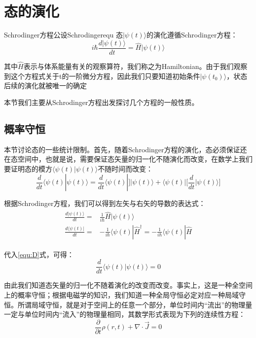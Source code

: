 \section{态的演化}\label{section2:evolution}
    \begin{definition}{Schrodinger方程公设}{Schrodingerequ}
        态$|\psi(t)\rangle$的演化遵循Schrodinger方程：
        \begin{equation}
            i\hbar\frac{d|\psi(t)\rangle}{dt}=\hat{H}|\psi(t)\rangle
        \end{equation}
        
        其中$\hat{H}$表示与体系能量有关的观察算符，我们称之为Hamiltonian。由于我们观察到这个方程式关于t的一阶微分方程，因此我们只要知道初始条件$|\psi(t_0)\rangle$，状态后续的演化就被唯一的确定
    \end{definition}
    
    本节我们主要从Schrodinger方程出发探讨几个方程的一般性质。
    \subsection{概率守恒}
    本节讨论态的一些统计限制。首先，随着Schrodinger方程的演化，态必须保证还在态空间中，也就是说，需要保证态矢量的归一化不随演化而改变，在数学上我们要证明态的模方$\langle\psi(t)|\psi(t)\rangle$不随时间而改变：
    \begin{equation}\label{equ:D}
        \frac{d}{dt}\langle\psi(t)|\psi(t)\rangle=\frac{d}{dt}\langle\psi(t)|\Big]|\psi(t)\rangle+\langle\psi(t)|\Big[\frac{d}{dt}|\psi(t)\rangle\Big]
    \end{equation}
    
    根据Schrodinger方程，我们可以得到左矢与右矢的导数的表达式：
    \begin{align}\label{equ2:E}
        \begin{split}
            \frac{d|\psi(t)\rangle}{dt}=&\frac{1}{i\hbar}\hat{H}|\psi(t)\rangle\\
            \frac{d\langle\psi(t)|}{dt}=&-\frac{1}{i\hbar}\langle\psi(t)|\hat{H}^\dagger=-\frac{1}{i\hbar}\langle\psi(t)|\hat{H}
        \end{split}
    \end{align}
    
    代入\ref{equ:D}式，可得：
    \begin{equation}
        \frac{d}{dt}\langle\psi(t)|\psi(t)\rangle=0
    \end{equation}
    
    由此我们知道态矢量的归一化不随着演化的改变而改变。事实上，这是一种全空间上的概率守恒；根据电磁学的知识，我们知道一种全局守恒必定对应一种局域守恒。所谓局域守恒，就是对于空间上的任意一个部分，单位时间内“流出”的物理量一定与单位时间内“流入”的物理量相同，其数学形式表现为下列的连续性方程：
    \begin{equation}
        \frac{\partial}{\partial t}\rho(r,t)+\nabla \cdot \Vec{J}=0
    \end{equation}
    
